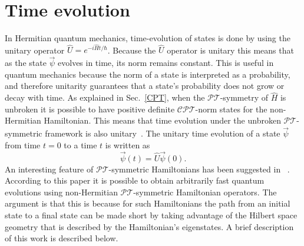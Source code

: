 \documentclass[12pt, a4paper]{report}
\newcommand\PT{\(\mathcal{PT}\)}
\newcommand\CPT{\(\mathcal{CPT}\)}
\begin{document}
\chapter{Time evolution}\label{TEv}
In Hermitian quantum mechanics, time-evolution of states is done by using the unitary operator $\hat{U} = e^{-i\hat{H}t/\hbar}$. Because the $\hat{U}$ operator is unitary this means that as the state $\vec{\psi}$ evolves in time, its norm remains constant. This is useful in quantum mechanics because the norm of a state is interpreted as a probability, and therefore unitarity guarantees that a state's probability does not grow or decay with time. As explained in Sec.~\ref{CPT}, when the \PT-symmetry of $\hat{H}$ is unbroken it is possible to have positive definite \CPT-norm states for the non-Hermitian Hamiltonian. This means that time evolution under the unbroken \PT-symmetric framework is also unitary~\cite{Jones-Smith, ComplexExtension, Mostafazadeh2}. 
The unitary time evolution of a state $\vec{\psi}$ from time $t = 0$ to a time $t$ is written as
\begin{equation}\label{eq:4.1}
\vec{\psi}(t) = \hat{U} \vec{\psi}(0).
\end{equation}
An interesting feature of \PT-symmetric Hamiltonians has been suggested in ~\cite{Bender_2007}. According to this paper it is possible to obtain arbitrarily fast quantum evolutions using non-Hermitian \PT-symmetric Hamiltonian operators. The argument is that this is because for such Hamiltonians the path from an initial state to a final state can be made short by taking advantage of the Hilbert space geometry that is described by the Hamiltonian's eigenstates. A brief description of this work is described below.

\end{document}
